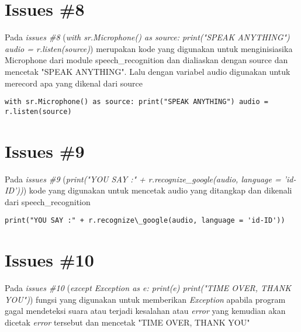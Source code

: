 \section{Issues \#8}
Pada \textit{issues \#8} (\textit{with sr.Microphone() as source: print("SPEAK ANYTHING") audio = r.listen(source)}) merupakan kode yang digunakan untuk menginisiasika Microphone dari module speech\_recognition dan dialiaskan dengan source dan mencetak "SPEAK ANYTHING". Lalu dengan variabel audio digunakan untuk merecord apa yang dikenal dari source
\begin{verbatim}
with sr.Microphone() as source: print("SPEAK ANYTHING") audio = r.listen(source)
\end{verbatim}
\section{Issues \#9}
Pada \textit{issues \#9} (\textit{print("YOU SAY :" + r.recognize\_google(audio, language = 'id-ID'))}) kode yang digunakan untuk mencetak audio yang ditangkap dan dikenali dari speech\_recognition
\begin{verbatim}
print("YOU SAY :" + r.recognize\_google(audio, language = 'id-ID'))
\end{verbatim}
\section{Issues \#10}
Pada \textit{issues \#10} (\textit{except Exception as e: print(e) print("TIME OVER, THANK YOU")}) fungsi yang digunakan untuk memberikan \textit{Exception} apabila program gagal mendeteksi suara atau terjadi kesalahan atau \textit{error} yang kemudian akan dicetak \textit{error} tersebut dan mencetak "TIME OVER, THANK YOU"